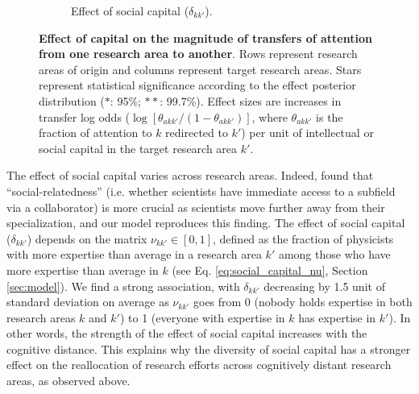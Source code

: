 \documentclass{article}
\begin{document}
\begin{figure}[h]
\begin{subfigure}{.5\textwidth}
    \caption{Effect of social capital ($\delta_{kk'}$).}
    \label{fig:social-capital-effect}
\end{subfigure}
\caption{\textbf{Effect of capital on the magnitude of transfers of attention from one research area to another}. Rows represent research areas of origin and columns represent target research areas. Stars represent statistical significance according to the effect posterior distribution ($\ast$: 95\%; $\ast\ast$: 99.7\%). Effect sizes are increases in transfer log odds ($\log {[\theta_{akk'}/(1-\theta_{akk'})]}$, where $\theta_{akk'}$ is the fraction of attention to $k$ redirected to $k'$) per unit of intellectual or social capital in the target research area $k'$.}
\label{fig:test}
\end{figure}

The effect of social capital varies across research areas. Indeed, \citet{Tripodi2020} found that ``social-relatedness'' (i.e. whether scientists have immediate access to a subfield via a collaborator) is more crucial as scientists move further away from their specialization, and our model reproduces this finding. The effect of social capital ($\delta_{kk'}$) depends on the matrix $\nu_{kk'}\in[0,1]$, defined as the fraction of physicists with more expertise than average in a research area $k'$ among those who have more expertise than average in $k$ (see Eq. \eqref{eq:social_capital_nu}, Section \ref{sec:model}). We find a strong association, with $\delta_{kk'}$ decreasing by 1.5 unit of standard deviation on average as $\nu_{kk'}$ goes from 0 (nobody holds expertise in both research areas $k$ and $k'$) to 1 (everyone with expertise in $k$ has expertise in $k'$). In other words, the strength of the effect of social capital increases with the cognitive distance. This explains why the diversity of social capital has a stronger effect on the reallocation of research efforts across cognitively distant research areas, as observed above.

\end{document}
